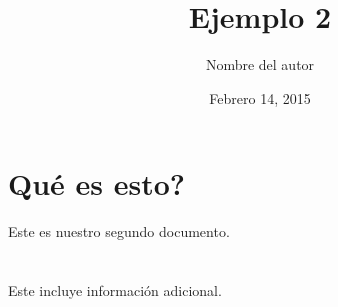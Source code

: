 \documentclass[a4paper,11pt, spanish]{article}
\begin{document}
\title{Ejemplo 2}
\author{Nombre del autor}
\date{Febrero 14, 2015}
\maketitle
\section{Qué es esto?}
Este es nuestro segundo documento.\\\\\\

Este incluye información adicional.
\end{document}
